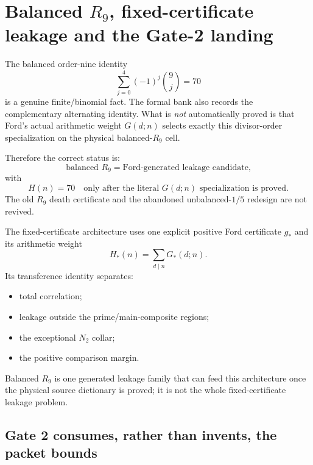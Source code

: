 \documentclass[11pt]{article}
\theoremstyle{definition}
\newcommand{\1}{\mathbf 1}
\begin{document}
{{{\section{Balanced $R_9$, fixed-certificate leakage and the Gate-2 landing}
\label{sec:r9-fcl}

The balanced order-nine identity
\[
\sum_{j=0}^{4}(-1)^j\binom9j=70
\]
is a genuine finite/binomial fact.  The formal bank also records the complementary
alternating identity.  What is \emph{not} automatically proved is that Ford's actual
arithmetic weight $G(d;n)$ selects exactly this divisor-order specialization on the physical
balanced-$R_9$ cell.

Therefore the correct status is:
\[
\boxed{
\text{balanced }R_9
=
\text{Ford-generated leakage candidate,}
}
\]
with
\[
\boxed{
H(n)=70
\quad\text{only after the literal }G(d;n)\text{ specialization is proved.}
}
\]
The old $R_9$ death certificate and the abandoned unbalanced-$1/5$ redesign are not
revived.

The fixed-certificate architecture uses one explicit positive Ford certificate $g_\ast$
and its arithmetic weight
\[
H_\ast(n)=\sum_{d\mid n}G_\ast(d;n).
\]
Its transference identity separates:
\begin{itemize}[leftmargin=1.6em]
\item total correlation;
\item leakage outside the prime/main-composite regions;
\item the exceptional $N_2$ collar;
\item the positive comparison margin.
\end{itemize}
Balanced $R_9$ is one generated leakage family that can feed this architecture once the
physical source dictionary is proved; it is not the whole fixed-certificate leakage
problem.

\subsection{Gate 2 consumes, rather than invents, the packet bounds}

}}}
\end{document}
